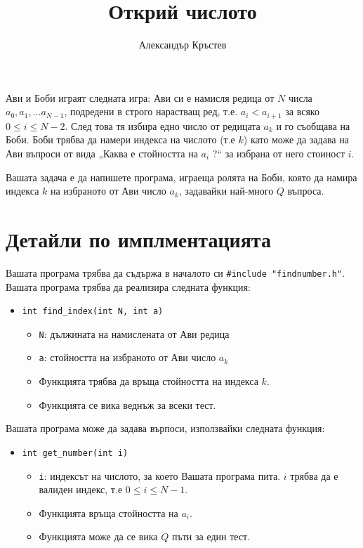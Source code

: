\documentclass[a4paper,11pt]{article}
\title{Открий числото}
\author{Александър Кръстев}
\date{}
\newcommand{\code}[1]{\texttt{#1}}
\newcommand{\noskip}{\vspace{-\parskip}}
\begin{document}
{%
    \centering \LARGE 
    \textbf{\@title}
    \par
}

Ави и Боби играят следната игра:
Ави си е намисля редица от $N$ числа $a_0,a_1,...a_{N-1}$, подредени в строго
нарастващ ред, т.е. $a_i < a_{i+1}$ за всяко $0 \leq i \leq N-2$.
След това тя избира едно число от редицата $a_k$ и го съобщава на Боби.
Боби трябва да намери индекса на числото (т.е $k$) като може да задава
на Ави въпроси от вида „Каква е стойността на $a_i$ ?“ за избрана от него
стоиност $i$.

Вашата задача е да напишете програма, играеща ролята на Боби, която да намира
индекса $k$ на избраното от Ави число $a_k$, задавайки най-много $Q$ въпроса.


\section*{Детайли по имплментацията}
Вашата програма трябва да съдържа в началото си \code{\#include "findnumber.h"}.
\\
Вашата програма трябва да реализира следната функция:

\noskip
\begin{itemize}
    \item \code{int find\_index(int N, int a)}
    \begin{itemize}
        \item \code{N}: дължината на намислената от Ави редица
        \item \code{a}: стойността на избраното от Ави число $a_k$
        \item Функцията трябва да връща стойността на индекса $k$.
        \item Функцията се вика веднъж за всеки тест.
    \end{itemize}
\end{itemize}

Вашата програма може да задава върпоси, използвайки следната функция:
\noskip
\begin{itemize}
    \item \code{int get\_number(int i)}
    \begin{itemize}
        \item \code{i}: индексът на числото, за което Вашата програма пита.
            $i$ трябва да е валиден индекс, т.е $0 \leq i \leq N - 1$.
        \item Функцията връща стойността на $a_i$.
        \item Функцията може да се вика $Q$ пъти за един тест.
    \end{itemize}
\end{itemize}
\end{document}
